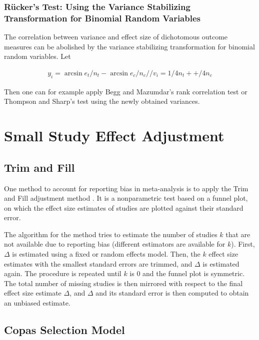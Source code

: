 \documentclass[11pt,a4paper,twoside]{book}\usepackage[]{graphicx}\usepackage[]{color}
\begin{document}
\subsubsection{R\"ucker's Test: Using the Variance Stabilizing Transformation for Binomial Random Variables}
The correlation between variance and effect size of dichotomous outcome measures can be abolished by the variance stabilizing transformation for binomial random variables. Let 

\begin{align}
y_{i} = \arcsin{e_{t}/n_{t}} - \arcsin{e_{c}/n_{c}}// 
v_{i} = 1/4n_{t} + +/4n_{c}
\end{align}

Then one can for example apply Begg and Mazumdar's rank correlation test or Thompson and Sharp's test using the newly obtained variances. 


\section{Small Study Effect Adjustment}
\subsection{Trim and Fill}
One method to account for reporting bias in meta-analysis is to apply the Trim and Fill adjustment method \citep{trimfill}. It is a nonparametric test based on a funnel plot, on which the effect size estimates of studies are plotted against their standard error. 

\vspace{0mm}
The algorithm for the method tries to estimate the number of studies $k$ that are not available due to reporting bias (different estimators are available for $k$). First, $\Delta$ is estimated using a fixed or random effects model. Then, the $k$ effect size estimates with the smallest standard errors are trimmed, and $\Delta$ is estimated again. The procedure is repeated until $k$ is 0 and the funnel plot is symmetric. The total number of missing studies is then mirrored with respect to the final effect size estimate $\Delta$, and $\Delta$ and its standard error is then computed to obtain an unbiased estimate.

\subsection{Copas Selection Model}
\end{document}
